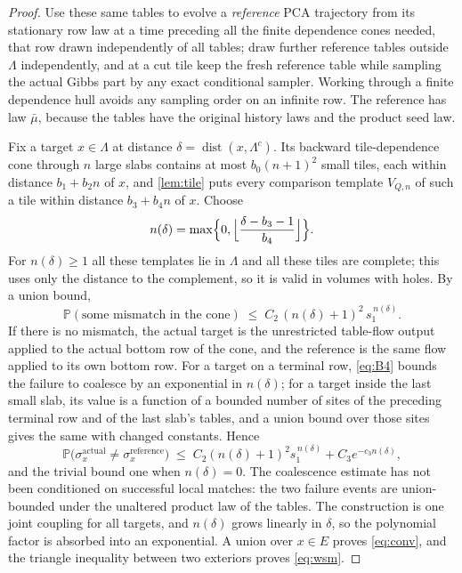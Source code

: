 \documentclass[11pt]{article}
\theoremstyle{plain}
\theoremstyle{definition}
\theoremstyle{remark}
\newcommand{\Prob}{\mathbb{P}}
\newcommand{\Lam}{\Lambda}
\newcommand{\ba}{\bar{\mu}}
\newcommand{\dist}{\operatorname{dist}}
\begin{document}
\begin{proof}
Use these same tables to evolve a \emph{reference} PCA trajectory from its stationary row law at a time preceding all the finite dependence cones needed, that row drawn independently of all tables; draw further reference tables outside $\Lam$ independently, and at a cut tile keep the fresh reference table while sampling the actual Gibbs part by any exact conditional sampler. Working through a finite dependence hull avoids any sampling order on an infinite row. The reference has law $\ba$, because the tables have the original history laws and the product seed law.

Fix a target $x\in\Lam$ at distance $\delta=\dist(x,\Lam^c)$. Its backward tile-dependence cone through $n$ large slabs contains at most $b_0(n+1)^2$ small tiles, each within distance $b_1+b_2n$ of $x$, and \cref{lem:tile} puts every comparison template $V_{Q,n}$ of such a tile within distance $b_3+b_4n$ of $x$. Choose
\begin{equation}
n(\delta)=\max\Bigl\{0,\Bigl\lfloor\frac{\delta-b_3-1}{b_4}\Bigr\rfloor\Bigr\}.
\label{eq:ndelta}
\end{equation}
For $n(\delta)\ge1$ all these templates lie in $\Lam$ and all these tiles are complete; this uses only the distance to the complement, so it is valid in volumes with holes. By a union bound,
\begin{equation}
\Prob(\text{some mismatch in the cone})\;\le\;C_2\,(n(\delta)+1)^2\,s_1^{\,n(\delta)}.
\label{eq:mismatch}
\end{equation}
If there is no mismatch, the actual target is the unrestricted table-flow output applied to the actual bottom row of the cone, and the reference is the same flow applied to its own bottom row. For a target on a terminal row, \eqref{eq:B4} bounds the failure to coalesce by an exponential in $n(\delta)$; for a target inside the last small slab, its value is a function of a bounded number of sites of the preceding terminal row and of the last slab's tables, and a union bound over those sites gives the same with changed constants. Hence
\begin{equation}
\Prob\bigl(\sigma^{\mathrm{actual}}_x\neq\sigma^{\mathrm{reference}}_x\bigr)\;\le\;C_2(n(\delta)+1)^2s_1^{\,n(\delta)}+C_3e^{-c_3n(\delta)},
\label{eq:target}
\end{equation}
and the trivial bound one when $n(\delta)=0$. The coalescence estimate has not been conditioned on successful local matches: the two failure events are union-bounded under the unaltered product law of the tables. The construction is one joint coupling for all targets, and $n(\delta)$ grows linearly in $\delta$, so the polynomial factor is absorbed into an exponential. A union over $x\in E$ proves \eqref{eq:conv}, and the triangle inequality between two exteriors proves \eqref{eq:wsm}.
\end{proof}
\end{document}
